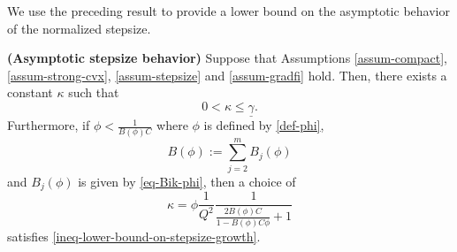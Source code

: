\documentclass[final,numbook]{svjour3}
\begin{document}
We use the preceding result to provide a lower bound on the asymptotic behavior of the normalized stepsize. 
\begin{theorem}\label{thm-lower-bound-stepsize-growth} \textbf{(Asymptotic stepsize behavior)}
Suppose that Assumptions \ref{assum-compact}, \ref{assum-strong-cvx}, \ref{assum-stepsize} and \ref{assum-gradfi} hold. Then, there exists a constant $\kappa$ such that 
\begin{equation}\label{ineq-lower-bound-on-stepsize-growth} 0 < \kappa  \leq {{\underline{\gamma}}}.
\end{equation}
Furthermore, if $\phi < \frac{1}{B(\phi)C}$ where $\phi$ is defined by \eqref{def-phi}, 
  \begin{equation}\label{def-B-phi-as-a-sum} B(\phi):=\sum_{j=2}^m B_j(\phi) \end{equation} 
and $B_j(\phi)$ is given by \eqref{eq-Bik-phi}, then a choice of  
\begin{equation}\label{eq-liminf-stepsize-bound}
\kappa = \phi \frac{1}{Q^2} \frac{1}{ \frac{2B(\phi)C}{1-B(\phi)C\phi} + 1} 
\end{equation}
satisfies \eqref{ineq-lower-bound-on-stepsize-growth}.
\end{theorem}
\end{document}
